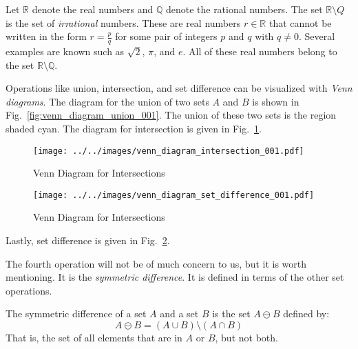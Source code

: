             \begin{example}
                Let $\mathbb{R}$ denote the real numbers and $\mathbb{Q}$ denote
                the rational numbers. The set $\mathbb{R}\setminus{Q}$ is the
                set of \textit{irrational} numbers. These are real numbers
                $r\in\mathbb{R}$ that cannot be written in the form
                $r=\frac{p}{q}$ for some pair of integers $p$ and $q$ with
                $q\ne{0}$. Several examples are known such as
                $\sqrt{2}$, $\pi$, and $e$. All of these real numbers belong to
                the set $\mathbb{R}\setminus\mathbb{Q}$.
            \end{example}
            Operations like union, intersection, and set difference can be
            visualized with \textit{Venn diagrams}. The diagram for the union
            of two sets $A$ and $B$ is shown in
            Fig.~\ref{fig:venn_diagram_union_001}. The union of these two sets
            is the region shaded cyan. The diagram for intersection is given
            in Fig.~\ref{fig:venn_diagram_intersection_001}.
            \begin{figure}[H]
                \centering
                \texttt{[image: ../../images/venn\_diagram\_intersection\_001.pdf]}
                \caption{Venn Diagram for Intersections}
                \label{fig:venn_diagram_intersection_001}
            \end{figure}
            \begin{figure}
                \centering
                \texttt{[image: ../../images/venn\_diagram\_set\_difference\_001.pdf]}
                \caption{Venn Diagram for Intersections}
                \label{fig:venn_diagram_set_difference_001}
            \end{figure}
            Lastly, set difference is given in
            Fig.~\ref{fig:venn_diagram_set_difference_001}.
            \par\hfill\par
            The fourth operation will not be of much concern to us, but it is
            worth mentioning. It is the \textit{symmetric difference}. It is
            defined in terms of the other set operations.
            \begin{definition}
                The symmetric difference of a set $A$ and a set $B$ is the
                set $A\ominus{B}$ defined by:
                \begin{equation}
                    A\ominus{B}=(A\cup{B})\setminus(A\cap{B})
                \end{equation}
                That is, the set of all elements that are in $A$ or $B$, but
                not both.
            \end{definition}
